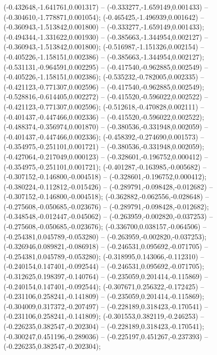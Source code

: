  (-0.432648,-1.641761,0.001317) -- (-0.333277,-1.659149,0.001433) -- (-0.304610,-1.778871,0.001054);
 (-0.465425,-1.496939,0.001642) -- (-0.360943,-1.513842,0.001800) -- (-0.333277,-1.659149,0.001433);
 (-0.494344,-1.331622,0.001930) -- (-0.385663,-1.344954,0.002127) -- (-0.360943,-1.513842,0.001800);
 (-0.516987,-1.151326,0.002154) -- (-0.405226,-1.158151,0.002386) -- (-0.385663,-1.344954,0.002127);
 (-0.531131,-0.964591,0.002295) -- (-0.417540,-0.962885,0.002549) -- (-0.405226,-1.158151,0.002386);
 (-0.535232,-0.782005,0.002335) -- (-0.421123,-0.771307,0.002596) -- (-0.417540,-0.962885,0.002549);
 (-0.528816,-0.614405,0.002272) -- (-0.415520,-0.596022,0.002522) -- (-0.421123,-0.771307,0.002596);
 (-0.512618,-0.470828,0.002111) -- (-0.401437,-0.447466,0.002336) -- (-0.415520,-0.596022,0.002522);
 (-0.488374,-0.356974,0.001870) -- (-0.380536,-0.331948,0.002059) -- (-0.401437,-0.447466,0.002336);
 (-0.458392,-0.274690,0.001573) -- (-0.354975,-0.251101,0.001721) -- (-0.380536,-0.331948,0.002059);
 (-0.427064,-0.217049,0.000123) -- (-0.328601,-0.196752,0.000412) -- (-0.354975,-0.251101,0.001721);
 (-0.401287,-0.163985,-0.005682) -- (-0.307152,-0.146800,-0.004518) -- (-0.328601,-0.196752,0.000412);
 (-0.380224,-0.112812,-0.015426) -- (-0.289791,-0.098428,-0.012682) -- (-0.307152,-0.146800,-0.004518);
 (-0.362882,-0.062556,-0.028648) -- (-0.275608,-0.050685,-0.023676) -- (-0.289791,-0.098428,-0.012682);
 (-0.348548,-0.012447,-0.045062) -- (-0.263959,-0.002820,-0.037253) -- (-0.275608,-0.050685,-0.023676);
 (-0.336700,0.038157,-0.064506) -- (-0.254381,0.045789,-0.053280) -- (-0.263959,-0.002820,-0.037253);
 (-0.326946,0.089821,-0.086918) -- (-0.246531,0.095692,-0.071705) -- (-0.254381,0.045789,-0.053280);
 (-0.318995,0.143066,-0.112310) -- (-0.240154,0.147401,-0.092544) -- (-0.246531,0.095692,-0.071705);
 (-0.312625,0.198397,-0.140764) -- (-0.235059,0.201414,-0.115869) -- (-0.240154,0.147401,-0.092544);
 (-0.307671,0.256322,-0.172425) -- (-0.231106,0.258241,-0.141809) -- (-0.235059,0.201414,-0.115869);
 (-0.304009,0.317372,-0.207497) -- (-0.228189,0.318423,-0.170541) -- (-0.231106,0.258241,-0.141809);
 (-0.301553,0.382119,-0.246253) -- (-0.226235,0.382547,-0.202304) -- (-0.228189,0.318423,-0.170541);
 (-0.300247,0.451196,-0.289036) -- (-0.225197,0.451267,-0.237393) -- (-0.226235,0.382547,-0.202304);
